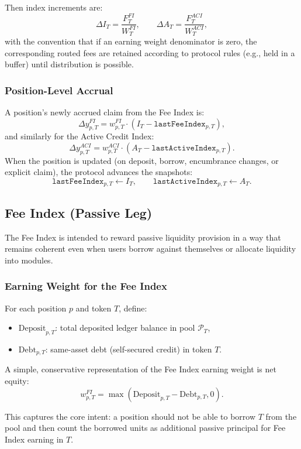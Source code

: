 \documentclass[version=preprint]{iacrcc}
\begin{document}
Then index increments are:
\[
\Delta I_T = \frac{F^{FI}_T}{W^{FI}_T},
\qquad
\Delta A_T = \frac{F^{ACI}_T}{W^{ACI}_T},
\]
with the convention that if an earning weight denominator is zero, the corresponding routed fees are retained according to protocol rules (e.g., held in a buffer) until distribution is possible.

\subsubsection{Position-Level Accrual}

A position’s newly accrued claim from the Fee Index is:
\[
\Delta y^{FI}_{p,T} = w^{FI}_{p,T} \cdot (I_T - \texttt{lastFeeIndex}_{p,T}),
\]
and similarly for the Active Credit Index:
\[
\Delta y^{ACI}_{p,T} = w^{ACI}_{p,T} \cdot (A_T - \texttt{lastActiveIndex}_{p,T}).
\]
When the position is updated (on deposit, borrow, encumbrance changes, or explicit claim), the protocol advances the snapshots:
\[
\texttt{lastFeeIndex}_{p,T} \leftarrow I_T,
\qquad
\texttt{lastActiveIndex}_{p,T} \leftarrow A_T.
\]

\subsection{Fee Index (Passive Leg)}

The Fee Index is intended to reward passive liquidity provision in a way that remains coherent even when users borrow against themselves or allocate liquidity into modules.

\subsubsection{Earning Weight for the Fee Index}

For each position $p$ and token $T$, define:
\begin{itemize}
  \item $\text{Deposit}_{p,T}$: total deposited ledger balance in pool $\mathcal{P}_T$,
  \item $\text{Debt}_{p,T}$: same-asset debt (self-secured credit) in token $T$.
\end{itemize}

A simple, conservative representation of the Fee Index earning weight is net equity:
\[
w^{FI}_{p,T} = \max(\text{Deposit}_{p,T} - \text{Debt}_{p,T}, 0).
\]

This captures the core intent: a position should not be able to borrow $T$ from the pool and then count the borrowed units as additional passive principal for Fee Index earning in $T$.
\end{document}
